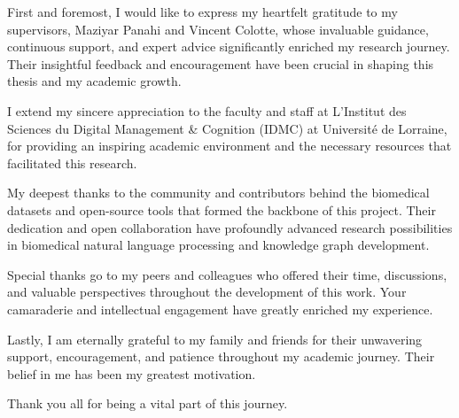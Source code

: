 \documentclass[
11pt, %
english, %
singlespacing, %
headsepline, %
]{MastersDoctoralThesis} %
\begin{document}
\begin{acknowledgements}
\addchaptertocentry{\acknowledgementname} %
First and foremost, I would like to express my heartfelt gratitude to my supervisors, Maziyar Panahi and Vincent Colotte, whose invaluable guidance, continuous support, and expert advice significantly enriched my research journey. Their insightful feedback and encouragement have been crucial in shaping this thesis and my academic growth.

I extend my sincere appreciation to the faculty and staff at L'Institut des Sciences du Digital Management \& Cognition (IDMC) at Université de Lorraine, for providing an inspiring academic environment and the necessary resources that facilitated this research.

My deepest thanks to the community and contributors behind the biomedical datasets and open-source tools that formed the backbone of this project. Their dedication and open collaboration have profoundly advanced research possibilities in biomedical natural language processing and knowledge graph development.

Special thanks go to my peers and colleagues who offered their time, discussions, and valuable perspectives throughout the development of this work. Your camaraderie and intellectual engagement have greatly enriched my experience.

Lastly, I am eternally grateful to my family and friends for their unwavering support, encouragement, and patience throughout my academic journey. Their belief in me has been my greatest motivation.

Thank you all for being a vital part of this journey.
\end{acknowledgements}


\tableofcontents %

\listoffigures %

\listoftables %

\end{document}
